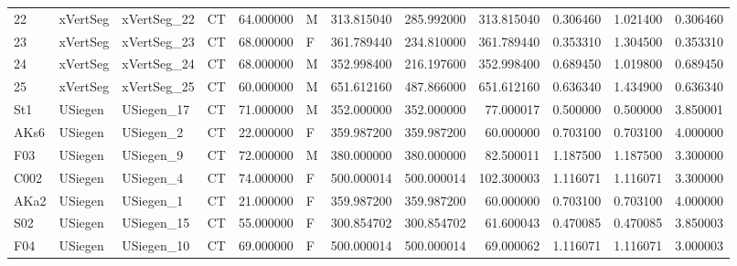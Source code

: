 \begin{tabular}{llllrlrrrrrr}
22     &        xVertSeg &  xVertSeg\_22 &                 CT &  64.000000 &        M &       313.815040 &    285.992000 &  313.815040 &               0.306460 &            1.021400 &          0.306460 \\
23     &        xVertSeg &  xVertSeg\_23 &                 CT &  68.000000 &        F &       361.789440 &    234.810000 &  361.789440 &               0.353310 &            1.304500 &          0.353310 \\
24     &        xVertSeg &  xVertSeg\_24 &                 CT &  68.000000 &        M &       352.998400 &    216.197600 &  352.998400 &               0.689450 &            1.019800 &          0.689450 \\
25     &        xVertSeg &  xVertSeg\_25 &                 CT &  60.000000 &        M &       651.612160 &    487.866000 &  651.612160 &               0.636340 &            1.434900 &          0.636340 \\
St1    &         USiegen &   USiegen\_17 &                 CT &  71.000000 &        M &       352.000000 &    352.000000 &   77.000017 &               0.500000 &            0.500000 &          3.850001 \\
AKs6   &         USiegen &    USiegen\_2 &                 CT &  22.000000 &        F &       359.987200 &    359.987200 &   60.000000 &               0.703100 &            0.703100 &          4.000000 \\
F03    &         USiegen &    USiegen\_9 &                 CT &  72.000000 &        M &       380.000000 &    380.000000 &   82.500011 &               1.187500 &            1.187500 &          3.300000 \\
C002   &         USiegen &    USiegen\_4 &                 CT &  74.000000 &        F &       500.000014 &    500.000014 &  102.300003 &               1.116071 &            1.116071 &          3.300000 \\
AKa2   &         USiegen &    USiegen\_1 &                 CT &  21.000000 &        F &       359.987200 &    359.987200 &   60.000000 &               0.703100 &            0.703100 &          4.000000 \\
S02    &         USiegen &   USiegen\_15 &                 CT &  55.000000 &        F &       300.854702 &    300.854702 &   61.600043 &               0.470085 &            0.470085 &          3.850003 \\
F04    &         USiegen &   USiegen\_10 &                 CT &  69.000000 &        F &       500.000014 &    500.000014 &   69.000062 &               1.116071 &            1.116071 &          3.000003 \\

\end{tabular}
